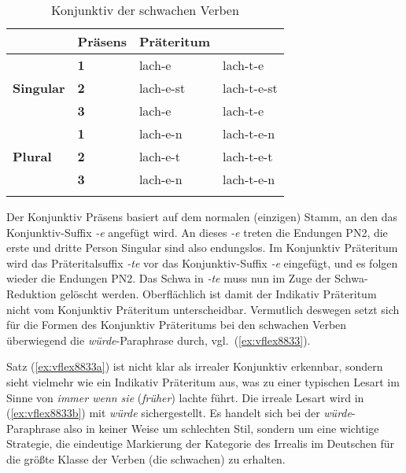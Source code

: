 \begin{table}
  \centering
  \begin{tabular}{llll}
    \lsptoprule
    \multicolumn{2}{c}{} & \textbf{Präsens} & \textbf{Präteritum} \\
    \midrule
    \multirow{3}{*}{\textbf{Singular}} & \textbf{1} & lach-e & lach-t-e \\
    & \textbf{2} & lach-e-st & lach-t-e-st \\
    & \textbf{3} & lach-e & lach-t-e \\
    \midrule
    \multirow{3}{*}{\textbf{Plural}} & \textbf{1} & lach-e-n & lach-t-e-n \\
    & \textbf{2} & lach-e-t & lach-t-e-t \\
    & \textbf{3} & lach-e-n & lach-t-e-n \\
    \lspbottomrule
  \end{tabular}
  \caption{Konjunktiv der schwachen Verben}
  \label{tab:schwkonj}
\end{table}


Der Konjunktiv Präsens basiert auf dem normalen (einzigen) Stamm, an den das Konjunktiv-Suffix \textit{-e} angefügt wird.
An dieses \textit{-e} treten die Endungen PN2, die erste und dritte Person Singular sind also endungslos.
Im Konjunktiv Präteritum wird das Präteritalsuffix \textit{-te} vor das Konjunktiv-Suffix \textit{-e} eingefügt, und es folgen wieder die Endungen PN2.
Das Schwa in \textit{-te} muss nun im Zuge der Schwa-Reduktion gelöscht werden.
Oberflächlich ist damit der Indikativ Präteritum nicht vom Konjunktiv Präteritum unterscheidbar.
Vermutlich deswegen setzt sich für die Formen des Konjunktiv Präteritums bei den schwachen Verben überwiegend die \textit{würde}-Paraphrase durch, vgl.\ (\ref{ex:vflex8833}).

\begin{exe}
  \ex\label{ex:vflex8833}
  \begin{xlist}
  \end{xlist}
\end{exe}

Satz (\ref{ex:vflex8833a}) ist nicht klar als irrealer Konjunktiv erkennbar, sondern sieht vielmehr wie ein Indikativ Präteritum aus, was zu einer typischen Lesart im Sinne von \textit{immer wenn sie }(\textit{früher}) {lachte} führt.
Die irreale Lesart wird in (\ref{ex:vflex8833b}) mit \textit{würde} sichergestellt.
Es handelt sich bei der \textit{würde}-Paraphrase also in keiner Weise um schlechten Stil, sondern um eine wichtige Strategie, die eindeutige Markierung der Kategorie des Irrealis im Deutschen für die größte Klasse der Verben (die schwachen) zu erhalten.


